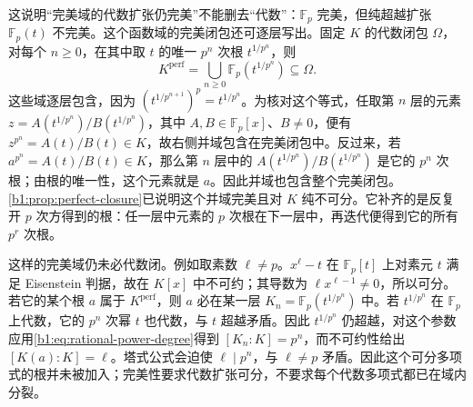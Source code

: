 \ProseParagraphBreak
这说明“完美域的代数扩张仍完美”不能删去“代数”：\(\mathbb F_p\) 完美，但纯超越扩张 \(\mathbb F_p(t)\) 不完美。这个函数域的完美闭包还可逐层写出。固定 \(K\) 的代数闭包 \(\Omega\)，对每个 \(n\ge0\)，在其中取 \(t\) 的唯一 \(p^n\) 次根 \(t^{1/p^n}\)，则
\[
	K^{\mathrm{perf}}=\bigcup_{n\geq0}\mathbb F_p(t^{1/p^n})\subseteq\Omega.
\]
这些域逐层包含，因为 \((t^{1/p^{n+1}})^p=t^{1/p^n}\)。为核对这个等式，任取第 \(n\) 层的元素 \(z=A(t^{1/p^n})/B(t^{1/p^n})\)，其中 \(A,B\in\mathbb F_p[x]\)、\(B\neq0\)，便有 \(z^{p^n}=A(t)/B(t)\in K\)，故右侧并域包含在完美闭包中。反过来，若 \(a^{p^n}=A(t)/B(t)\in K\)，那么第 \(n\) 层中的 \(A(t^{1/p^n})/B(t^{1/p^n})\) 是它的 \(p^n\) 次根；由根的唯一性，这个元素就是 \(a\)。因此并域也包含整个完美闭包。\cref{b1:prop:perfect-closure}已说明这个并域完美且对 \(K\) 纯不可分。它补齐的是反复开 \(p\) 次方得到的根：任一层中元素的 \(p\) 次根在下一层中，再迭代便得到它的所有 \(p^r\) 次根。

\ProseParagraphBreak
这样的完美域仍未必代数闭。例如取素数 \(\ell\ne p\)。\(x^\ell-t\) 在 \(\mathbb F_p[t]\) 上对素元 \(t\) 满足 Eisenstein 判据，故在 \(K[x]\) 中不可约；其导数为 \(\ell x^{\ell-1}\ne0\)，所以可分。若它的某个根 \(a\) 属于 \(K^{\mathrm{perf}}\)，则 \(a\) 必在某一层 \(K_n=\mathbb F_p(t^{1/p^n})\) 中。若 \(t^{1/p^n}\) 在 \(\mathbb F_p\) 上代数，它的 \(p^n\) 次幂 \(t\) 也代数，与 \(t\) 超越矛盾。因此 \(t^{1/p^n}\) 仍超越，对这个参数应用\eqref{b1:eq:rational-power-degree}得到 \([K_n:K]=p^n\)，而不可约性给出 \([K(a):K]=\ell\)。塔式公式会迫使 \(\ell\mid p^n\)，与 \(\ell\ne p\) 矛盾。因此这个可分多项式的根并未被加入；完美性要求代数扩张可分，不要求每个代数多项式都已在域内分裂。
